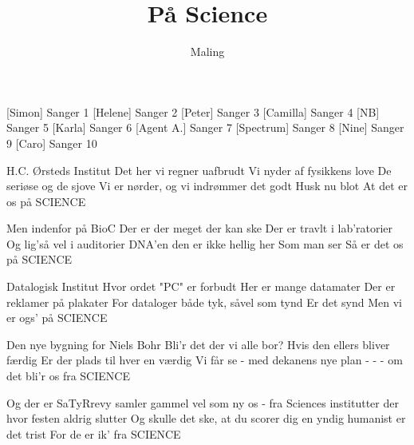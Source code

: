 \documentclass[a4paper,11pt]{article}
\title{På Science}
\author{Maling}
\begin{document}
\maketitle

\begin{roles}
[Simon] Sanger 1
[Helene] Sanger 2
[Peter] Sanger 3
[Camilla] Sanger 4
[NB] Sanger 5
[Karla] Sanger 6
[Agent A.] Sanger 7
[Spectrum] Sanger 8
[Nine] Sanger 9
[Caro] Sanger 10
\end{roles}

\begin{song}

 H.C. Ørsteds Institut
Det her vi regner uafbrudt
Vi nyder af fysikkens love
De seriøse og de sjove
Vi er nørder, og vi indrømmer det godt
Husk nu blot
At det er os på SCIENCE

 Men indenfor på BioC
Der er der meget der kan ske
Der er travlt i lab’ratorier
Og lig’så vel i auditorier
DNA’en den er ikke hellig her
Som man ser
Så er det os på SCIENCE

 Datalogisk Institut
Hvor ordet "PC" er forbudt
Her er mange datamater
Der er reklamer på plakater
For dataloger både tyk, såvel som tynd
Er det synd
Men vi er ogs' på SCIENCE

 Den nye bygning for Niels Bohr
Bli'r det der vi alle bor?
Hvis den ellers bliver færdig
Er der plads til hver en værdig
Vi får se - med dekanens nye plan
- - -
om det bli'r os fra SCIENCE

 Og der er SaTyRrevy
samler gammel vel som ny
os - fra Sciences institutter
der hvor festen aldrig slutter
Og skulle det ske, at du scorer dig en yndig humanist
er det trist
For de er ik' fra SCIENCE

\end{song}
\end{document}
